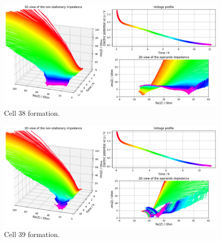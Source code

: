\begin{figure}[h]
    \centering
    \includegraphics[width=\linewidth]{figures/application3/image19.png}
    \caption{Cell 38 formation.}
    \label{fig:cell38_formation}
\end{figure}

\begin{figure}[h]
    \centering
    \includegraphics[width=\linewidth]{figures/application3/image20.png}
    \caption{Cell 39 formation.}
    \label{fig:cell39_formation}
\end{figure}